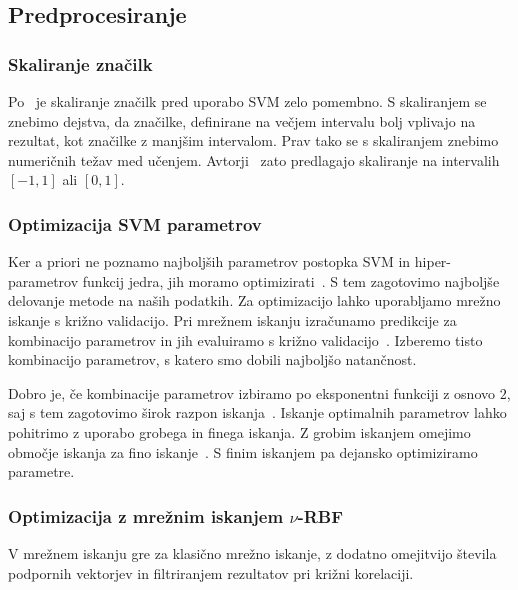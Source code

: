 {\subsection{Predprocesiranje}
\subsubsection{Skaliranje značilk}

Po~\cite{hsu2003practical} je skaliranje značilk pred uporabo SVM zelo pomembno. S skaliranjem se znebimo dejstva, da značilke, definirane na večjem intervalu bolj vplivajo na rezultat, kot značilke z manjšim intervalom. Prav tako se s skaliranjem znebimo numeričnih težav med učenjem. Avtorji~\cite{hsu2003practical} zato predlagajo skaliranje na intervalih $[-1, 1]$ ali $[0, 1]$.







\subsubsection{Optimizacija SVM parametrov}\label{sec:optimizacija-svm-parametrov}

Ker a priori ne poznamo najboljših parametrov postopka SVM in hiper-parametrov funkcij jedra, jih moramo optimizirati~\cite{hsu2003practical}. S tem zagotovimo najboljše delovanje metode na naših podatkih. Za optimizacijo lahko uporabljamo mrežno iskanje s križno validacijo.  Pri mrežnem iskanju izračunamo predikcije za kombinacijo parametrov in jih evaluiramo s križno validacijo~\cite{hsu2003practical}. Izberemo tisto kombinacijo parametrov, s katero smo dobili najboljšo natančnost. 

Dobro je, če kombinacije parametrov izbiramo po eksponentni funkciji z osnovo $2$, saj s tem zagotovimo širok razpon iskanja~\cite{hsu2003practical}. Iskanje optimalnih parametrov lahko pohitrimo z uporabo grobega in finega iskanja. Z grobim iskanjem omejimo območje iskanja za fino iskanje~\cite{hsu2003practical}. S finim iskanjem pa dejansko optimiziramo parametre.


\subsubsection{Optimizacija z mrežnim iskanjem \texorpdfstring{$\nu$}{nu}-RBF}\label{sec:nurbf}
V mrežnem iskanju \nurbf gre za klasično mrežno iskanje, z dodatno omejitvijo števila podpornih vektorjev in filtriranjem rezultatov pri križni korelaciji.

}
